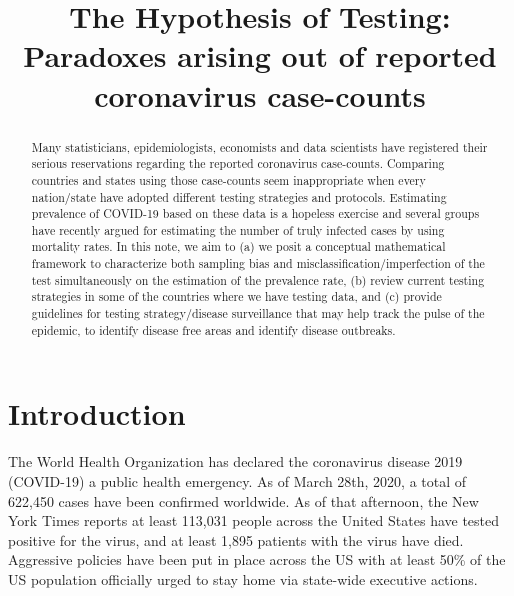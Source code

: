 \documentclass[12pt]{article}
\numberwithin{equation}{section}
\theoremstyle{plain}
\begin{document}
\title{The Hypothesis of Testing: Paradoxes arising out of reported coronavirus case-counts}
\maketitle

\begin{abstract}
Many statisticians, epidemiologists, economists and data scientists have registered their serious reservations regarding the reported coronavirus case-counts. Comparing countries and states using those case-counts seem inappropriate when every nation/state have adopted different testing strategies and protocols. Estimating prevalence of COVID-19 based on these data is a hopeless exercise and several groups have recently argued for estimating the number of truly infected cases by using mortality rates.
In this note, we aim to (a)	we posit a conceptual mathematical framework to characterize both sampling bias and misclassification/imperfection of the test simultaneously on the estimation of the prevalence rate, (b)	review current testing strategies in some of the countries where we have testing data, and (c) provide guidelines for testing strategy/disease surveillance that may help track the pulse of the epidemic, to identify disease free areas and identify disease outbreaks.
\end{abstract}

\section{Introduction}

The World Health Organization has declared the coronavirus disease 2019 (COVID-19) a public health emergency.  As of March 28th, 2020, a total of 622,450 cases have been confirmed worldwide.  As of that afternoon, the New York Times reports at least 113,031 people across the United States have tested positive for the virus, and at least 1,895 patients with the virus have died.  Aggressive policies have been put in place across the US with at least 50\% of the US population officially urged to stay home via state-wide executive actions.
\end{document}

